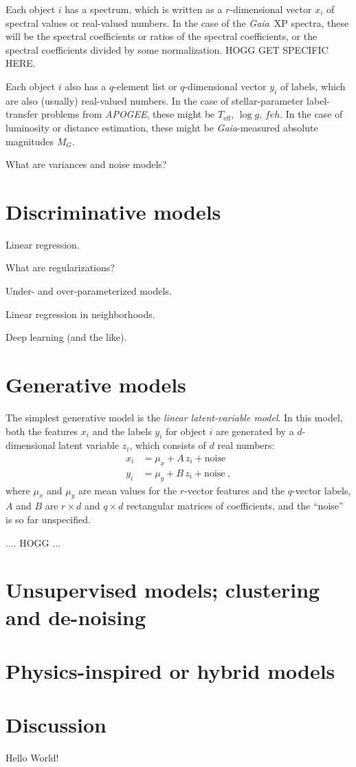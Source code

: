\documentclass[modern]{aastex631}
\newcommand{\acronym}[1]{\small{#1}}
\newcommand{\project}[1]{\textsl{#1}}
\newcommand{\Gaia}{\project{Gaia}}
\newcommand{\APOGEE}{\project{\acronym{APOGEE}}}
\newcommand{\teff}{T_{\mathrm{eff}}}
\newcommand{\logg}{\log g}
\begin{document}
Each object $i$ has a spectrum, which is written as a $r$-dimensional vector $x_i$ of spectral values or real-valued numbers.
In the case of the \Gaia\ XP spectra, these will be the spectral coefficients or ratios of the spectral coefficients, or the spectral coefficients divided by some normalization. HOGG GET SPECIFIC HERE.

Each object $i$ also has a $q$-element list or $q$-dimensional vector $y_i$ of labels, which are also (usually) real-valued numbers.
In the case of stellar-parameter label-transfer problems from \APOGEE, these might be $\teff$, $\logg$, $feh$.
In the case of luminosity or distance estimation, these might be \Gaia-measured absolute magnitudes $M_G$.

What are variances and noise models?

\section{Discriminative models}

Linear regression.

What are regularizations?

Under- and over-parameterized models.

Linear regression in neighborhoods.

Deep learning (and the like).

\section{Generative models}

The simplest generative model is the \emph{linear latent-variable model}.
In this model, both the features $x_i$ and the labels $y_i$ for object $i$ are generated by a $d$-dimensional latent variable $z_i$, which consists of $d$ real numbers:
\begin{align}
  x_i &= \mu_x + A\,z_i + \mbox{noise} \\
  y_i &= \mu_y + B\,z_i + \mbox{noise} ~,
\end{align}
where $\mu_x$ and $\mu_y$ are mean values for the $r$-vector features and the $q$-vector labels,
$A$ and $B$ are $r\times d$ and $q\times d$ rectangular matrices of coefficients,
and the ``noise'' is so far unspecified.

.... HOGG ...

\section{Unsupervised models; clustering and de-noising}

\section{Physics-inspired or hybrid models}

\section{Discussion}

Hello World!

{}

\end{document}
